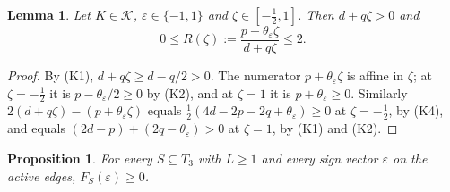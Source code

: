 \documentclass{amsart}
\newtheorem{proposition}[theorem]{Proposition}
\newtheorem{lemma}[theorem]{Lemma}
\theoremstyle{definition}
\theoremstyle{remark}
\numberwithin{equation}{section}
\newcommand{\cK}{\mathcal{K}}
\begin{document}
\begin{lemma}\label{lem:step}
Let $K\in\cK$, $\varepsilon\in\{-1,1\}$ and $\zeta\in[-\frac12,1]$. Then $d+q\zeta>0$ and
\[
0\le R(\zeta):=\frac{p+\theta_\varepsilon\zeta}{d+q\zeta}\le2 .
\]
\end{lemma}

\begin{proof}
By (K1), $d+q\zeta\ge d-q/2>0$. The numerator $p+\theta_\varepsilon\zeta$ is affine in $\zeta$; at $\zeta=-\frac12$ it is $p-\theta_\varepsilon/2\ge0$ by (K2), and at $\zeta=1$ it is $p+\theta_\varepsilon\ge0$. Similarly $2(d+q\zeta)-(p+\theta_\varepsilon\zeta)$ equals $\frac12(4d-2p-2q+\theta_\varepsilon)\ge0$ at $\zeta=-\frac12$, by (K4), and equals $(2d-p)+(2q-\theta_\varepsilon)>0$ at $\zeta=1$, by (K1) and (K2).
\end{proof}

\begin{proposition}\label{prop:Fpos}
For every $S\subseteq T_3$ with $L\ge1$ and every sign vector $\varepsilon$ on the active edges, $F_S(\varepsilon)\ge0$.
\end{proposition}
\end{document}
